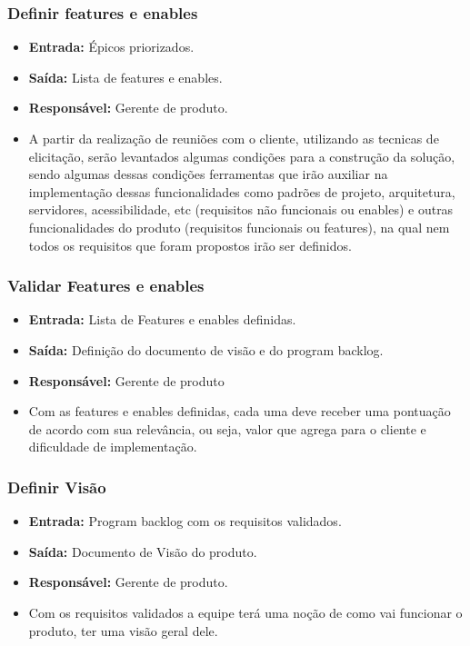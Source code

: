 \subsubsection{Definir features e enables}
  \begin{itemize}
    \item \textbf{Entrada:} Épicos priorizados.
    \item \textbf{Saída:} Lista de features e enables.
    \item \textbf{Responsável:} Gerente de produto.
    \item A partir da realização de reuniões com o cliente, utilizando as tecnicas de elicitação, serão levantados algumas condições
      para a construção da solução, sendo algumas dessas condições ferramentas que irão auxiliar na implementação dessas
      funcionalidades como padrões de projeto, arquitetura, servidores, acessibilidade, etc (requisitos não funcionais ou enables)
      e outras funcionalidades do produto (requisitos funcionais ou features), na qual nem todos os requisitos que foram propostos
      irão ser definidos.
  \end{itemize}

\subsubsection{Validar Features e enables}
  \begin{itemize}
    \item \textbf{Entrada:} Lista de Features e enables definidas.
    \item \textbf{Saída:} Definição do documento de visão e do program backlog.
    \item \textbf{Responsável:} Gerente de produto
    \item Com as features e enables definidas, cada uma deve receber uma pontuação de acordo com sua relev\^{a}ncia, ou seja, valor
      que agrega para o cliente e dificuldade de implementação.
  \end{itemize}

\subsubsection{Definir Visão}
  \begin{itemize}
    \item \textbf{Entrada:} Program backlog com os requisitos validados.
    \item \textbf{Saída:} Documento de Visão do produto.
    \item \textbf{Responsável:} Gerente de produto.
    \item Com os requisitos validados a equipe terá uma noção de como vai funcionar o produto, ter uma visão geral dele.
  \end{itemize}

